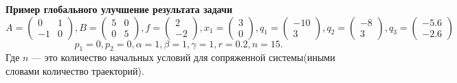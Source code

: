 \documentclass[11pt]{article}
\begin{document}
\newpage

{\vspace*{-2cm} \hspace*{-1cm} \textbf{Пример глобального улучшение результата задачи}}
\[A = \begin{pmatrix}
0&1\\
-1&0
\end{pmatrix},
B = \begin{pmatrix}
5&0\\
0&5
\end{pmatrix},
f = \begin{pmatrix}
2\\
-2
\end{pmatrix} ,
x_1 = \begin{pmatrix}
3\\
0
\end{pmatrix},
q_1 = \begin{pmatrix}
-10\\
3
\end{pmatrix},
q_2 = \begin{pmatrix}
-8\\
3
\end{pmatrix},
q_3 = \begin{pmatrix}
-5.6\\
-2.6
\end{pmatrix} \]
\[p_1 = 0, p_2 = 0, \alpha = 1,\beta = 1,\gamma = 1, r = 0.2, n = 15. \]
{Где $n$ --- это количество начальных условий для сопряженной системы(иными словами количество траекторий).}
\end{document}
